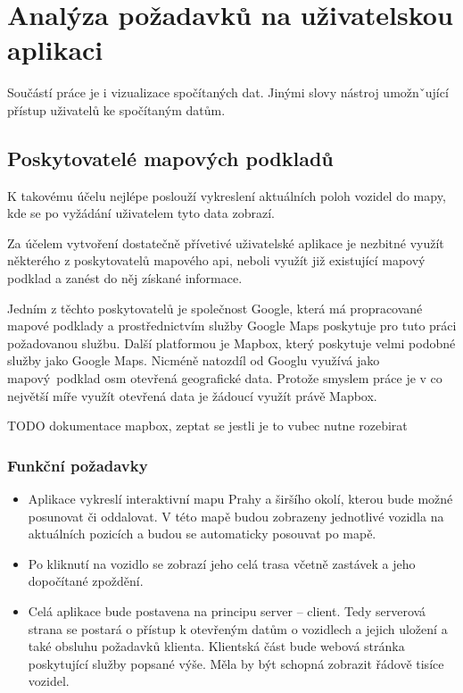 \section{Analýza požadavků na uživatelskou aplikaci}

Součástí práce je i vizualizace spočítaných dat. Jinými slovy nástroj umožnˇující přístup uživatelů ke spočítaným datům.

\subsection{Poskytovatelé mapových podkladů}

K takovému účelu nejlépe poslouží vykreslení aktuálních poloh vozidel do mapy, kde se po vyžádání uživatelem tyto data zobrazí.

\bigbreak

Za účelem vytvoření dostatečně přívetivé uživatelské aplikace je nezbitné využít některého z poskytovatelů mapového \gls{api}, neboli využít již existující mapový podklad a zanést do něj získané informace.

\bigbreak

Jedním z těchto poskytovatelů je společnost Google, která má propracované mapové podklady a prostřednictvím služby Google Maps poskytuje pro tuto práci požadovanou službu. Další platformou je Mapbox, který poskytuje velmi podobné služby jako Google Maps. Nicméně natozdíl od Googlu využívá jako mapový podklad \gls{osm} {otevřená geografické data}. Protože smyslem práce je v co největší míře využít otevřená data je žádoucí využít právě Mapbox.

\bigbreak

TODO dokumentace mapbox, zeptat se jestli je to vubec nutne rozebirat

\subsubsection{Funkční požadavky}

\begin{itemize}
	\item Aplikace vykreslí interaktivní mapu Prahy a širšího okolí, kterou bude možné posunovat či oddalovat. V této mapě budou zobrazeny jednotlivé vozidla na aktuálních pozicích a budou se automaticky posouvat po mapě.

	\item Po kliknutí na vozidlo se zobrazí jeho celá trasa včetně zastávek a jeho dopočítané zpoždění.

	\item Celá aplikace bude postavena na principu server -- client. Tedy serverová strana se postará o přístup k otevřeným datům o vozidlech a jejich uložení a také obsluhu požadavků klienta. Klientská část bude webová stránka poskytující služby popsané výše. Měla by být schopná zobrazit řádově tisíce vozidel.
\end{itemize}

